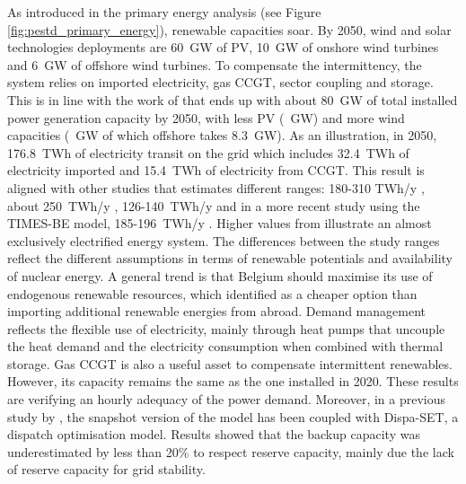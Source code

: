As introduced in the primary energy analysis (see Figure \ref{fig:pestd_primary_energy}), renewable capacities soar. By 2050, wind and solar technologies deployments are 60~GW of \gls{PV}, 10~GW of onshore wind turbines and 6~GW of offshore wind turbines. To compensate the intermittency, the system relies on imported electricity, gas \gls{CCGT}, sector coupling and storage. This is in line with the work of \citet{Devogelaer2020} that ends up with about 80~GW of total installed power generation capacity by 2050, with less \gls{PV} (~GW) and more wind capacities (~GW of which offshore takes 8.3~GW). As an illustration, in 2050, 176.8~TWh of electricity transit on the grid which includes 32.4~TWh of electricity imported and 15.4~TWh of electricity from \gls{CCGT}. This result is aligned with other studies that estimates different ranges: 180-310 TWh/y \cite{Devogelaer2013}, about 250~TWh/y \cite{Devogelaer2020}, 126-140~TWh/y \cite{My2050} and in a more recent study 
using the TIMES-BE model, 185-196~TWh/y \cite{PATHS2050}. Higher values from \citet{Devogelaer2013} illustrate an almost exclusively electrified energy system. The differences between the study ranges reflect the different assumptions in terms of renewable potentials and availability of nuclear energy. A general trend is that Belgium should maximise its use of endogenous renewable resources, which \citet{dubois2023multi} identified as a cheaper option than importing additional renewable energies from abroad. Demand management reflects the flexible use of electricity, mainly through heat pumps that uncouple the heat demand and the electricity consumption when combined with thermal storage. Gas \gls{CCGT} is also a useful asset to compensate intermittent renewables. However, its capacity remains the same as the one installed in 2020. These results are verifying an hourly adequacy of the power demand. Moreover, in a previous study by \citet{pavivcevic2022bidirectionnal}, the snapshot version of the model has been coupled with Dispa-SET, a dispatch optimisation model. Results showed that the backup capacity was underestimated by less than 20\% to respect reserve capacity, mainly due the lack of reserve capacity for grid stability.  


